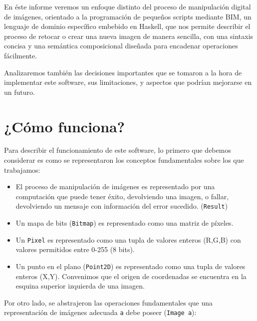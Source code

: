 \documentclass[a4paper, 11pt]{article} %
\begin{document}
En éste informe veremos un enfoque distinto del proceso de manipulación digital de imágenes, orientado a la programación de pequeños scripts mediante BIM, un lenguaje de dominio específico embebido en Haskell, que nos permite describir el proceso de retocar o crear una nueva imagen de manera sencilla, con una sintaxis concisa y una semántica composicional diseñada para encadenar operaciones fácilmente.

Analizaremos también las decisiones importantes que se tomaron a la hora de implementar este software, sus limitaciones, y aspectos que podrían mejorarse en un futuro.



\pagebreak


\section*{¿Cómo funciona?}

	Para describir el funcionamiento de este software, lo primero que debemos considerar es como se representaron los conceptos fundamentales sobre los que trabajamos:

	\begin{itemize}
	    \item El proceso de manipulación de imágenes es representado por una computación que puede tener éxito, devolviendo una imagen, o fallar, devolviendo un mensaje con información del error sucedido. (\texttt{Result})
		\item Un mapa de bits (\texttt{Bitmap}) es representado como una matriz de píxeles. 
		\item Un \texttt{Pixel} es representado como una tupla de valores enteros	  (R,G,B) con valores permitidos entre 0-255 (8 bits).
		\item Un punto en el plano (\texttt{Point2D}) es representado como una tupla de valores enteros (X,Y). Convenimos que el origen de coordenadas se encuentra en la esquina superior izquierda de una imagen.
	\end{itemize} 

\noindent Por otro lado, se abstrajeron las operaciones fundamentales que una representación de imágenes adecuada \texttt{a} debe poseer (\texttt{Image a}):\\
	
\end{document}
